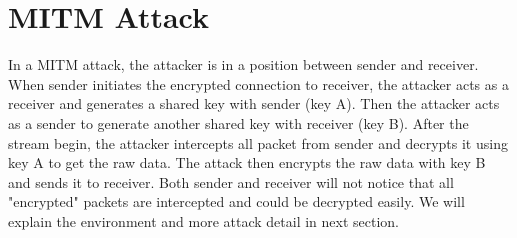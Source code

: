 \section{MITM Attack}

In a MITM attack, the attacker is in a position between sender and receiver. When sender initiates the encrypted connection to receiver, the attacker acts as a receiver and generates a shared key with sender (key A). Then the attacker acts as a sender to generate another shared key with receiver (key B). After the stream begin, the attacker intercepts all packet from sender and decrypts it using key A to get the raw data. The attack then encrypts the raw data with key B and sends it to receiver. Both sender and receiver will not notice that all "encrypted" packets are intercepted and could be decrypted easily. We will explain the environment and more attack detail in next section.
